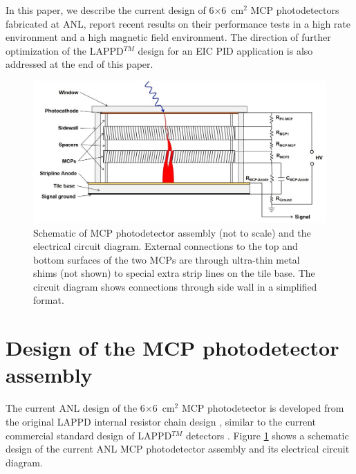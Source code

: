 \documentclass[preprint,5p]{elsarticle}
\begin{document}
In this paper, we describe the current design of 6$\times$6~cm$^2$ MCP 
photodetectors fabricated at ANL, report recent results on their performance tests in a high 
rate environment and a high magnetic field environment. The direction of 
further optimization of the LAPPD$^{TM}$ design for an EIC PID application is 
also addressed at the end of this paper.

\begin{figure}[tbp]
\centering \includegraphics[scale=0.3]{fig/MCPs_design.png}
\caption{Schematic of MCP photodetector assembly (not to scale) and the 
   electrical circuit diagram. External connections to the top and bottom 
surfaces of the two MCPs are through ultra-thin metal shims (not shown) to 
special extra strip lines on the tile base. The circuit diagram shows 
connections through side wall in a simplified format.} 
\label{fig:design}
\end{figure}

\section{Design of the MCP photodetector assembly} \label{sec_design}
The current ANL design of the 6$\times$6~cm$^2$ MCP photodetector is developed 
from the original LAPPD internal resistor chain design \cite{Wang-MCPs2}, 
similar to the current commercial standard design of LAPPD$^{TM}$ detectors 
\cite{Craven-MCPs}. Figure \ref{fig:design} shows a schematic design of the 
current ANL MCP photodetector assembly and its electrical circuit diagram.
 
\end{document}
